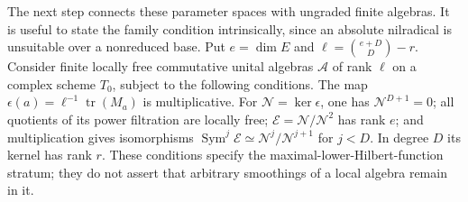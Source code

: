 \documentclass[11pt,reqno]{amsart}
\numberwithin{equation}{section}
\theoremstyle{definition}\newtheorem{definition}[theorem]{Definition}
\theoremstyle{remark}\newtheorem{remark}[theorem]{Remark}
\DeclareMathOperator{\Sym}{Sym}\DeclareMathOperator{\Gr}{Gr}
\begin{document}
The next step connects these parameter spaces with ungraded finite
algebras.  It is useful to state the family condition intrinsically,
since an absolute nilradical is unsuitable over a nonreduced base.
Put \(e=\dim E\) and
\(\ell=\binom{e+D}{D}-r\).  Consider finite locally free commutative
unital algebras \(\mathcal A\) of rank \(\ell\) on a complex scheme
\(T_0\), subject to the following conditions.  The map
\(\epsilon(a)=\ell^{-1}\operatorname{tr}(M_a)\) is multiplicative.
For \(\mathcal N=\ker\epsilon\), one has
\(\mathcal N^{D+1}=0\); all quotients of its power filtration are
locally free; \(\mathcal E=\mathcal N/\mathcal N^2\) has rank \(e\);
and multiplication gives isomorphisms
\(\Sym^j\mathcal E\simeq\mathcal N^j/\mathcal N^{j+1}\) for
\(j<D\).  In degree \(D\) its kernel has rank \(r\).  These
conditions specify the maximal-lower-Hilbert-function stratum; they
do not assert that arbitrary smoothings of a local algebra remain
in it.
\end{document}
